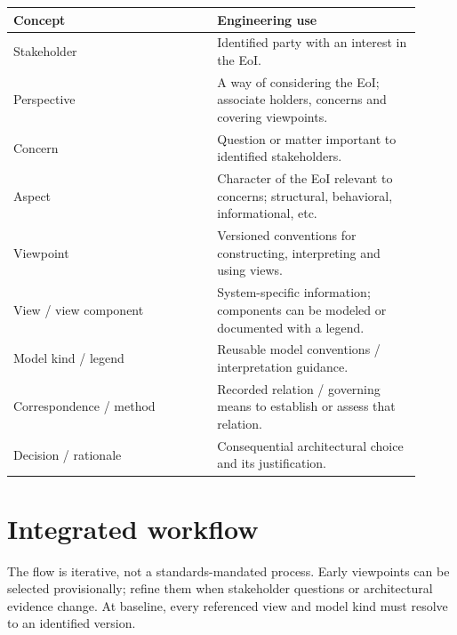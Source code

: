 \documentclass[11pt,letterpaper]{article}
\newcommand{\docsection}[1]{\Needspace{5\baselineskip}\section{#1}}
\begin{document}
\begin{longtable}{@{}>{\RaggedRight\arraybackslash}p{0.457\linewidth}>{\RaggedRight\arraybackslash}p{0.457\linewidth}@{}}
\toprule
\textbf{Concept} & \textbf{Engineering use}\\\midrule
\endhead
Stakeholder & Identified party with an interest in the EoI.\\
Perspective & A way of considering the EoI; associate holders, concerns and covering viewpoints.\\
Concern & Question or matter important to identified stakeholders.\\
Aspect & Character of the EoI relevant to concerns; structural, behavioral, informational, etc.\\
Viewpoint & Versioned conventions for constructing, interpreting and using views.\\
View / view component & System-specific information; components can be modeled or documented with a legend.\\
Model kind / legend & Reusable model conventions / interpretation guidance.\\
Correspondence / method & Recorded relation / governing means to establish or assess that relation.\\
Decision / rationale & Consequential architectural choice and its justification.\\
\bottomrule
\end{longtable}
\docsection{Integrated workflow}
\begin{center}\end{center}
The flow is iterative, not a standards-mandated process. Early viewpoints can be selected provisionally; refine them when stakeholder questions or architectural evidence change. At baseline, every referenced view and model kind must resolve to an identified version.
\end{document}
